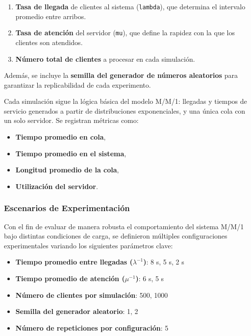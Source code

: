 \documentclass{article}
\begin{document}
\begin{enumerate}
  \item \textbf{Tasa de llegada} de clientes al sistema (\texttt{lambda}), que determina el intervalo promedio entre arribos.
  \item \textbf{Tasa de atención} del servidor (\texttt{mu}), que define la rapidez con la que los clientes son atendidos.
  \item \textbf{Número total de clientes} a procesar en cada simulación.
\end{enumerate}

Además, se incluye la \textbf{semilla del generador de números aleatorios} para garantizar la replicabilidad de cada experimento.

Cada simulación sigue la lógica básica del modelo M/M/1: llegadas y tiempos de servicio generados a partir de distribuciones exponenciales, y una única cola con un solo servidor. Se registran métricas como:

\begin{itemize}
  \item \textbf{Tiempo promedio en cola},
  \item \textbf{Tiempo promedio en el sistema},
  \item \textbf{Longitud promedio de la cola},
  \item \textbf{Utilización del servidor}.
\end{itemize}

\subsubsection*{Escenarios de Experimentación}

Con el fin de evaluar de manera robusta el comportamiento del sistema M/M/1 bajo distintas condiciones de carga, se definieron múltiples configuraciones experimentales variando los siguientes parámetros clave:

\begin{itemize}
  \item \textbf{Tiempo promedio entre llegadas (\(\lambda^{-1}\))}: 8 s, 5 s, 2 s
  \item \textbf{Tiempo promedio de atención (\(\mu^{-1}\))}: 6 s, 5 s
  \item \textbf{Número de clientes por simulación}: 500, 1000
  \item \textbf{Semilla del generador aleatorio}: 1, 2
  \item \textbf{Número de repeticiones por configuración}: 5
\end{itemize}
\end{document}

